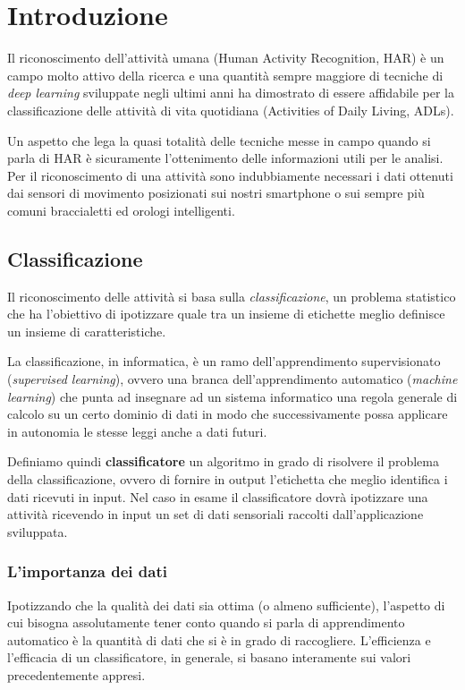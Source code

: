 \chapter{Introduzione}

Il riconoscimento dell'attività umana (Human Activity Recognition, HAR) è un campo molto attivo della ricerca e una
quantità sempre maggiore di tecniche di \textit{deep learning} sviluppate negli ultimi anni ha dimostrato di essere 
affidabile per la classificazione delle attività di vita quotidiana (Activities of Daily Living, ADLs).

Un aspetto che lega la quasi totalità delle tecniche messe in campo quando si parla di HAR è sicuramente l'ottenimento delle informazioni 
utili per le analisi. Per il riconoscimento di una attività sono indubbiamente necessari i dati ottenuti dai
sensori di movimento posizionati sui nostri smartphone o sui sempre più comuni braccialetti ed orologi intelligenti.

\section{Classificazione}
Il riconoscimento delle attività si basa sulla \textit{classificazione}, un problema statistico che ha l'obiettivo di ipotizzare 
quale tra un insieme di etichette meglio definisce un insieme di caratteristiche. 

La classificazione, in informatica, è un ramo dell'apprendimento supervisionato (\textit{supervised learning}),
ovvero una branca dell'apprendimento automatico (\textit{machine learning}) che punta ad insegnare ad un sistema informatico una regola generale
di calcolo su un certo dominio di dati in modo che successivamente possa applicare in autonomia le stesse leggi anche a dati futuri.

Definiamo quindi \textbf{classificatore} un algoritmo in grado di risolvere il problema della classificazione, ovvero di fornire in output 
l'etichetta che meglio identifica i dati ricevuti in input.
Nel caso in esame il classificatore dovrà ipotizzare una attività ricevendo in input un set di dati sensoriali
raccolti dall'applicazione sviluppata.

\subsection{L'importanza dei dati}
Ipotizzando che la qualità dei dati sia ottima (o almeno sufficiente), l'aspetto di cui bisogna assolutamente tener conto quando 
si parla di apprendimento automatico è la quantità di dati che si è in grado di raccogliere. 
L'efficienza e l'efficacia di un classificatore, in generale, si basano interamente sui valori precedentemente appresi.

